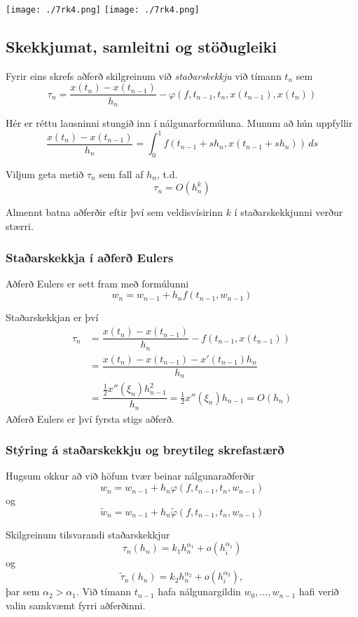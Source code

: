 \documentclass[icelandic,a4paper,12pt]{article}
\begin{document}
{\texttt{[image: ./7rk4.png]}}
{\texttt{[image: ./7rk4.png]}}



\subsection{Skekkjumat, samleitni og stöðugleiki} 
Fyrir eins skrefs aðferð skilgreinum við {\it staðarskekkju}
við tímann $t_n$ sem
$$ 
\tau_n = \dfrac{x(t_n)-x(t_{n-1})}{h_n} - 
\varphi(f,t_{n-1},t_n,x(t_{n-1}),x(t_{n})) 
$$

\pause
\smallskip
Hér er réttu lausninni stungið inn í nálgunarformúluna.
Munum að hún uppfyllir 
$$
\dfrac{x(t_n)-x(t_{n-1})}{h_n}
=\int_0^1 f(t_{n-1}+sh_n,x(t_{n-1}+sh_n))\, ds
$$

\pause
\smallskip
Viljum geta metið $\tau_n$ sem fall af $h_n$, t.d.
  $$ 
    \tau_n = O(h_n^k) 
  $$

\pause
\smallskip
Almennt batna aðferðir eftir því sem veldisvísirinn  $k$ 
í staðarskekkjunni verður stærri.



\subsubsection{Staðarskekkja í aðferð Eulers} 
Aðferð Eulers er sett fram með formúlunni
$$
  w_n=w_{n-1}+h_nf(t_{n-1},w_{n-1})
$$ 

\pause
Staðarskekkjan er því
\begin{align*}
  \tau_n&=\dfrac{x(t_n)-x(t_{n-1})}{h_n}-f(t_{n-1},x(t_{n-1}))\\
&=\dfrac{x(t_n)-x(t_{n-1})-x'(t_{n-1})h_n}{h_n}\\
&=\dfrac{\tfrac 12 x''(\xi_{n})h_{n-1}^2}{h_n}
=\tfrac 12 x''(\xi_{n})h_{n-1}=O(h_n)
\end{align*}
Aðferð Eulers er því fyrsta stigs aðferð.



\subsubsection{Stýring á staðarskekkju og breytileg skrefastærð} 
Hugsum okkur að við höfum tvær beinar nálgunaraðferðir
$$
 w_{n} = w_{n-1} + h_n\varphi(f,t_{n-1},t_n,w_{n-1})
$$
og
$$
  \tilde w_{n} = w_{n-1} + h_n\tilde\varphi(f,t_{n-1},t_n,w_{n-1})
$$

\pause
Skilgreinum tilsvarandi staðarskekkjur
  $$ \tau_n(h_n) = k_1h_n^{\alpha_1} + o(h_i^{\alpha_1}) 
$$
og
  $$ \tilde\tau_n(h_n) = k_2h_n^{\alpha_2} + o(h_i^{\alpha_2}),
$$
þar sem  $\alpha_2>\alpha_1$.  Við tímann $t_{n-1}$ hafa
nálgunargildin $w_0,\ldots,w_{n-1}$ hafi verið valin  samkvæmt 
fyrri aðferðinni.  
\end{document}
